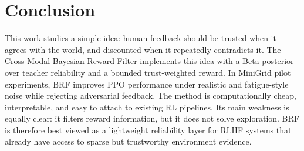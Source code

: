 \documentclass[11pt]{article}
\begin{document}
\section{Conclusion}

This work studies a simple idea: human feedback should be trusted when it agrees with the world, and discounted when it repeatedly contradicts it. The Cross-Modal Bayesian Reward Filter implements this idea with a Beta posterior over teacher reliability and a bounded trust-weighted reward. In MiniGrid pilot experiments, BRF improves PPO performance under realistic and fatigue-style noise while rejecting adversarial feedback. The method is computationally cheap, interpretable, and easy to attach to existing RL pipelines. Its main weakness is equally clear: it filters reward information, but it does not solve exploration. BRF is therefore best viewed as a lightweight reliability layer for RLHF systems that already have access to sparse but trustworthy environment evidence.



\end{document}
